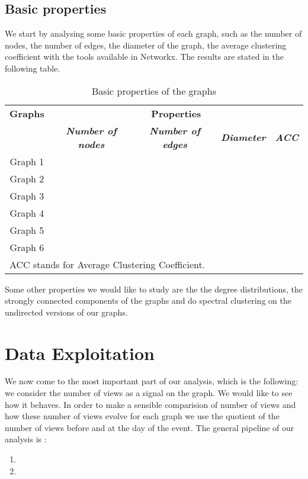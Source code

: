 \documentclass[conference]{IEEEtran}
\begin{document}
\subsection{Basic properties}
We start by analysing some basic properties of each graph, such as the number of nodes, the number of edges, the diameter of the graph, the average clustering coefficient with the tools available in Networkx. The results are stated in the  following table. 

\begin{table}[htbp]
\caption{Basic properties of the graphs}
\begin{center}
\begin{tabular}{|c|c|c|c|c|}
\hline
\textbf{Graphs}&\multicolumn{4}{|c|}{\textbf{Properties}} \\
\cline{2-5} 
\textbf{ } & \textbf{\textit{Number of nodes}}& \textbf{\textit{Number of edges}}& \textbf{\textit{Diameter}} & \textbf{\textit{ACC}}\\
\hline
Graph 1 & & & & \\
\hline
Graph 2& & & & \\
\hline
Graph 3& & & & \\
\hline
Graph 4& & & & \\
\hline
Graph 5& & & & \\
\hline
Graph 6 & & & & \\
\hline
\multicolumn{4}{l}{ACC stands for Average Clustering Coefficient.} \\
\end{tabular}
\end{center}
\end{table}

Some other properties we would like to  study are the the degree distributions, the strongly connected components of the graphs and do spectral clustering on the undirected versions of our graphs. 

\section{Data Exploitation}

We now come to the most important part of our analysis, which is the following: we consider the number of views as a signal on the graph. We would like to see how it behaves. In order to make a sensible comparision of number of views and how these number of views evolve for each graph we use the quotient of the number of views before and at the day of the event. 
The general pipeline of our analysis is :  
\begin{enumerate}
\item 
\item 
\end{enumerate}
\end{document}
